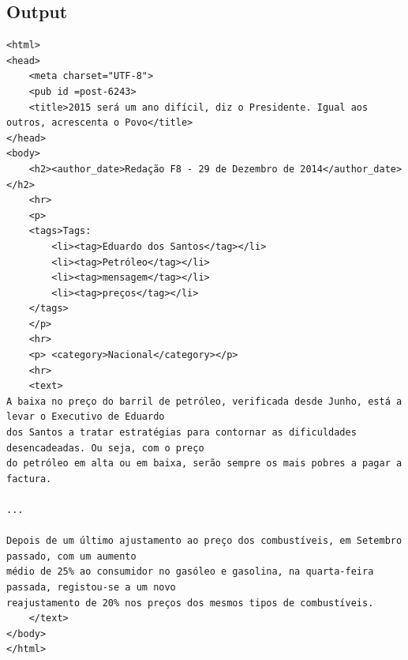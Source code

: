 \documentclass[25pt]{article}
\begin{document}
    \subsection{Output}
    \begin{verbatim}
<html>
<head>
    <meta charset="UTF-8">
    <pub id =post-6243>
    <title>2015 será um ano dif­ícil, diz o Presidente. Igual aos outros, acrescenta o Povo</title>
</head>
<body>
    <h2><author_date>Redação F8 - 29 de Dezembro de 2014</author_date></h2>
    <hr>
    <p>
    <tags>Tags:
        <li><tag>Eduardo dos Santos</tag></li>
        <li><tag>Petróleo</tag></li>
        <li><tag>mensagem</tag></li>
        <li><tag>preços</tag></li>
    </tags>
    </p>
    <hr>
    <p>	<category>Nacional</category></p>
    <hr>
    <text>
A baixa no preço do barril de petróleo, verificada desde Junho, está a levar o Executivo de Eduardo
dos Santos a tratar estratégias para contornar as dificuldades desencadeadas. Ou seja, com o preço
do petróleo em alta ou em baixa, serão sempre os mais pobres a pagar a factura.

...

Depois de um último ajustamento ao preço dos combust­íveis, em Setembro passado, com um aumento
médio de 25% ao consumidor no gasóleo e gasolina, na quarta-feira passada, registou-se a um novo
reajustamento de 20% nos preços dos mesmos tipos de combust­íveis.        
    </text>
</body>
</html>
    \end{verbatim}
\end{document}
